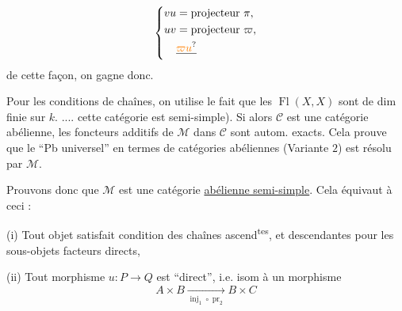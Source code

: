 \[
\left\{\begin{aligned}
 vu&=\text{projecteur }\pi,\\
 uv&=\text{projecteur }\varpi,\\
 &\deleted{\unsure{\varpi u}}
\end{aligned}\right.
\]
de cette façon, on gagne donc.

Pour les conditions de chaînes, on utilise le fait que les $\operatorname{Fl}(X,X)$ sont de  dim finie sur $k$. ....
cette catégorie est semi-simple). Si alors $\mathcal C$ est une catégorie abélienne, les foncteurs additifs de $\mathcal M$ dans $\mathcal C$ sont autom. exacts. Cela prouve que le ``Pb universel'' en termes de catégories abéliennes (Variante $2$) est résolu par $\mathcal M$.

Prouvons donc que $\mathcal M$ est une catégorie \uline{abélienne semi-simple}. Cela équivaut à ceci :


(i) Tout objet satisfait condition des chaînes ascend\textsuperscript{tes}, et descendantes pour les sous-objets facteurs directs,


(ii) Tout morphisme $u:P\longrightarrow Q$ est ``direct'', i.e. isom à un morphisme
\[
 A\times B\xrightarrow[\operatorname{inj}_1\circ\operatorname{pr}_2]{}B\times C
\]

